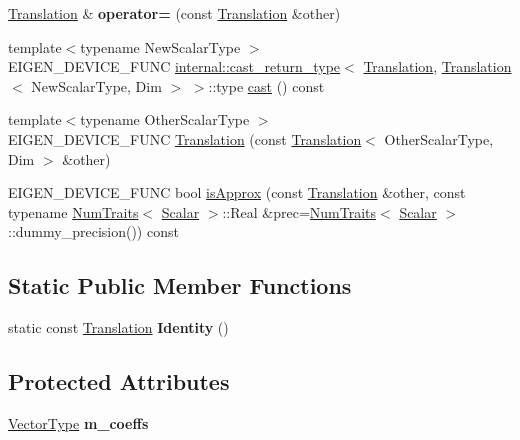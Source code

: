 \begin{DoxyCompactItemize}
\mbox{\hyperlink{class_eigen_1_1_translation}{Translation}} \& {\bfseries operator=} (const \mbox{\hyperlink{class_eigen_1_1_translation}{Translation}} \&other)
\item 
{\footnotesize template$<$typename New\+Scalar\+Type $>$ }\\E\+I\+G\+E\+N\+\_\+\+D\+E\+V\+I\+C\+E\+\_\+\+F\+U\+NC \mbox{\hyperlink{struct_eigen_1_1internal_1_1cast__return__type}{internal\+::cast\+\_\+return\+\_\+type}}$<$ \mbox{\hyperlink{class_eigen_1_1_translation}{Translation}}, \mbox{\hyperlink{class_eigen_1_1_translation}{Translation}}$<$ New\+Scalar\+Type, Dim $>$ $>$\+::type \mbox{\hyperlink{class_eigen_1_1_translation_a1d30bbadbafd009cda142f15ff7abcc2}{cast}} () const
\item 
{\footnotesize template$<$typename Other\+Scalar\+Type $>$ }\\E\+I\+G\+E\+N\+\_\+\+D\+E\+V\+I\+C\+E\+\_\+\+F\+U\+NC \mbox{\hyperlink{class_eigen_1_1_translation_a8d5e06de92ca432d94f661ace3f0a274}{Translation}} (const \mbox{\hyperlink{class_eigen_1_1_translation}{Translation}}$<$ Other\+Scalar\+Type, Dim $>$ \&other)
\item 
E\+I\+G\+E\+N\+\_\+\+D\+E\+V\+I\+C\+E\+\_\+\+F\+U\+NC bool \mbox{\hyperlink{class_eigen_1_1_translation_a3610eaa76745dd8f2c76dd9cc949dfa5}{is\+Approx}} (const \mbox{\hyperlink{class_eigen_1_1_translation}{Translation}} \&other, const typename \mbox{\hyperlink{struct_eigen_1_1_num_traits}{Num\+Traits}}$<$ \mbox{\hyperlink{class_eigen_1_1_translation_ad596bf21ced4b902cc242205df486e21}{Scalar}} $>$\+::Real \&prec=\mbox{\hyperlink{struct_eigen_1_1_num_traits}{Num\+Traits}}$<$ \mbox{\hyperlink{class_eigen_1_1_translation_ad596bf21ced4b902cc242205df486e21}{Scalar}} $>$\+::dummy\+\_\+precision()) const
\end{DoxyCompactItemize}
\subsection*{Static Public Member Functions}
\begin{DoxyCompactItemize}
\item 
\mbox{\label{class_eigen_1_1_translation_a00d0a30a13348f54a751cb21c8d46db7}} 
static const \mbox{\hyperlink{class_eigen_1_1_translation}{Translation}} {\bfseries Identity} ()
\end{DoxyCompactItemize}
\subsection*{Protected Attributes}
\begin{DoxyCompactItemize}
\item 
\mbox{\label{class_eigen_1_1_translation_a262aefa906b46690a15cc3923f84ba45}} 
\mbox{\hyperlink{class_eigen_1_1_translation_a339e17dfec5394ae563f62cca0df451f}{Vector\+Type}} {\bfseries m\+\_\+coeffs}
\end{DoxyCompactItemize}

